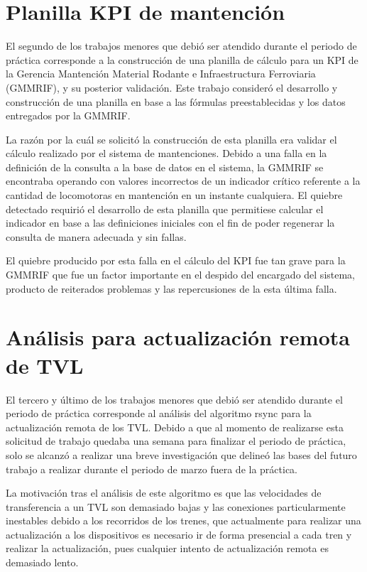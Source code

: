 \documentclass[oneside,12pt, letterpaper, titlepage]{book}
\begin{document}
\section{Planilla KPI de mantención}
El segundo de los trabajos menores que debió ser atendido durante el periodo de práctica corresponde a la construcción de una planilla de cálculo para un KPI de la Gerencia Mantención Material Rodante e Infraestructura Ferroviaria (GMMRIF), y su posterior validación. Este trabajo consideró el desarrollo y construcción de una planilla en base a las fórmulas preestablecidas y los datos entregados por la GMMRIF.

La razón por la cuál se solicitó la construcción de esta planilla era validar el cálculo realizado por el sistema de mantenciones. Debido a una falla en la definición de la consulta a la base de datos en el sistema, la GMMRIF se encontraba operando con valores incorrectos de un indicador crítico referente a la cantidad de locomotoras en mantención en un instante cualquiera. El quiebre detectado requirió el desarrollo de esta planilla que permitiese calcular el indicador en base a las definiciones iniciales con el fin de poder regenerar la consulta de manera adecuada y sin fallas. 

El quiebre producido por esta falla en el cálculo del KPI fue tan grave para la GMMRIF que fue un factor importante en el despido del encargado del sistema, producto de reiterados problemas y las repercusiones de la esta última falla.

\section{Análisis para actualización remota de TVL}
El tercero y último de los trabajos menores que debió ser atendido durante el periodo de práctica corresponde al análisis del algoritmo rsync para la actualización remota de los TVL. Debido a que al momento de realizarse esta solicitud de trabajo quedaba una semana para finalizar el periodo de práctica, solo se alcanzó a realizar una breve investigación que delineó las bases del futuro trabajo a realizar durante el periodo de marzo fuera de la práctica. 

La motivación tras el análisis de este algoritmo es que las velocidades de transferencia a un TVL son demasiado bajas y las conexiones particularmente inestables debido a los recorridos de los trenes, que actualmente para realizar una actualización a los dispositivos es necesario ir de forma presencial a cada tren y realizar la actualización, pues cualquier intento de actualización remota es demasiado lento.
\end{document}
